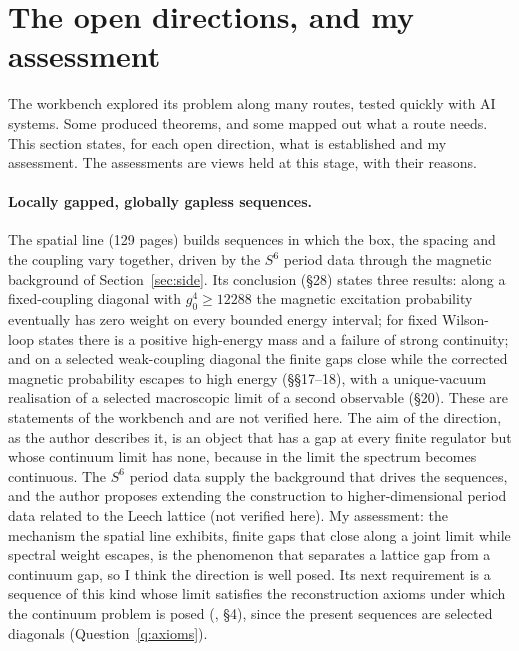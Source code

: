 \section{The open directions, and my assessment}\label{sec:directions}

The workbench explored its problem along many routes, tested quickly with AI systems. Some produced theorems, and some mapped out what a route needs. This section states, for each open direction, what is established and my assessment. The assessments are views held at this stage, with their reasons.

\paragraph{Locally gapped, globally gapless sequences.}
The spatial line (129 pages) builds sequences in which the box, the spacing and the coupling vary together, driven by the $S^6$ period data through the magnetic background of Section~\ref{sec:side}. Its conclusion (§28) states three results: along a fixed-coupling diagonal with $g_0^4\ge12288$ the magnetic excitation probability eventually has zero weight on every bounded energy interval; for fixed Wilson-loop states there is a positive high-energy mass and a failure of strong continuity; and on a selected weak-coupling diagonal the finite gaps close while the corrected magnetic probability escapes to high energy (§§17--18), with a unique-vacuum realisation of a selected macroscopic limit of a second observable (§20). These are statements of the workbench and are not verified here. The aim of the direction, as the author describes it, is an object that has a gap at every finite regulator but whose continuum limit has none, because in the limit the spectrum becomes continuous. The $S^6$ period data supply the background that drives the sequences, and the author proposes extending the construction to higher-dimensional period data related to the Leech lattice (not verified here).
My assessment: the mechanism the spatial line exhibits, finite gaps that close along a joint limit while spectral weight escapes, is the phenomenon that separates a lattice gap from a continuum gap, so I think the direction is well posed. Its next requirement is a sequence of this kind whose limit satisfies the reconstruction axioms under which the continuum problem is posed (\cite{JaffeWitten}, §4), since the present sequences are selected diagonals (Question~\ref{q:axioms}).

